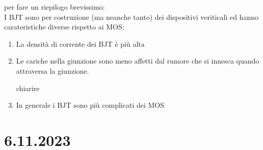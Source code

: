 per fare un riepilogo brevissimo:\\
I BJT sono per costruzione (ma neanche tanto) dei dispositivi veriticali ed hanno carateristiche diverse rispetto ai MOS:
\begin{enumerate}
    \item La densità di corrente dei BJT è più alta
    \item Le cariche nella giunzione sono meno affetti dal rumore che si innesca quando attraversa la giunzione.
    \begin{ricevimento}
        chiarire
    \end{ricevimento}
    \item In generale i BJT sono più complicati dei MOS
\end{enumerate}

\section{6.11.2023}
